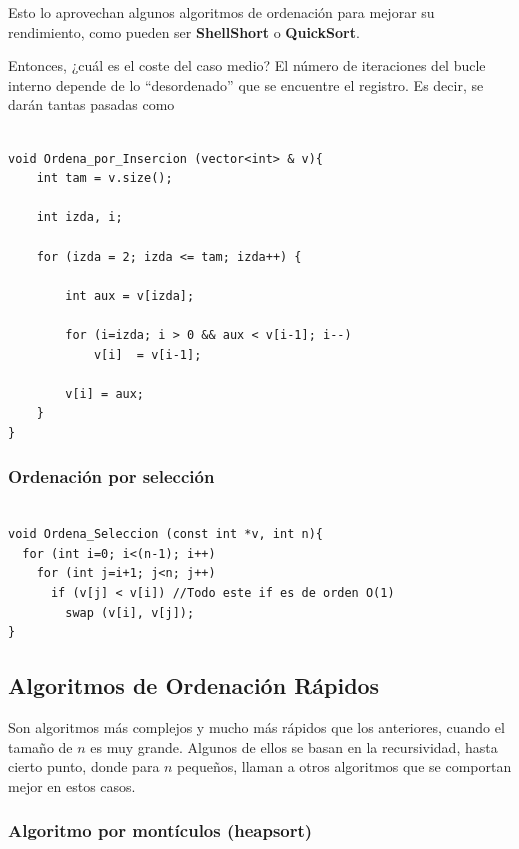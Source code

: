 \documentclass[10pt,a4paper,spanish]{report}
\theoremstyle{definition}
\theoremstyle{remark}
\begin{document}

Esto lo aprovechan algunos algoritmos de ordenación para mejorar su rendimiento, como pueden ser \textbf{\textcolor[rgb]{0.2,0.5,0.5}{ShellShort}} o \textbf{\textcolor[rgb]{0.2,0.5,0.5}{QuickSort}}.

Entonces, ¿cuál es el coste del caso medio? El número de iteraciones del bucle interno depende de lo ``desordenado'' que se encuentre el registro. Es decir, se darán tantas pasadas como 



\begin{verbatim}

void Ordena_por_Insercion (vector<int> & v){    
    int tam = v.size();

    int izda, i; 

    for (izda = 2; izda <= tam; izda++) {
        
        int aux = v[izda];
        
        for (i=izda; i > 0 && aux < v[i-1]; i--)
            v[i]  = v[i-1]; 
                            
        v[i] = aux; 
    }
}
\end{verbatim}

\subsubsection{\textcolor[rgb]{0.2,0.5,0.5}Ordenación por selección}

\begin{verbatim}
    
void Ordena_Seleccion (const int *v, int n){
  for (int i=0; i<(n-1); i++)
    for (int j=i+1; j<n; j++)
      if (v[j] < v[i]) //Todo este if es de orden O(1)
        swap (v[i], v[j]);
}
\end{verbatim}

\subsection{\textcolor[rgb]{0.2,0.5,0.5}Algoritmos de Ordenación Rápidos}

Son algoritmos más complejos y mucho más rápidos que los anteriores, cuando el tamaño de $n$ es muy grande. Algunos de ellos se basan en la recursividad, hasta cierto punto, donde para $n$ pequeños, llaman a otros algoritmos que se comportan mejor en estos casos.

\subsubsection{\textcolor[rgb]{0.2,0.5,0.5}Algoritmo por montículos (heapsort)}
\end{document}
